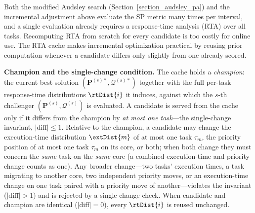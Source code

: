     Both the modified Audsley search (Section~\ref{section_audsley_pa}) and the incremental adjustment above evaluate the SP metric many times per interval, and a single evaluation already requires a response-time analysis (RTA) over all tasks.
    Recomputing RTA from scratch for every candidate is too costly for online use.
    The RTA cache makes incremental optimization practical by reusing prior computation whenever a candidate differs only slightly from one already scored.

    \textbf{Champion and the single-change condition.}
    The cache holds a \emph{champion}: the current best solution $(\boldsymbol{P}^{(s)*},\boldsymbol{\mathcal{Q}}^{(s)*})$ together with the full per-task response-time distributions $\rtDist{i}$ it induces, against which the $s$-th challenger $(\boldsymbol{P}^{(s)},\boldsymbol{\mathcal{Q}}^{(s)})$ is evaluated.
    A candidate is served from the cache only if it differs from the champion by \emph{at most one task}---the single-change invariant, $|\mathrm{diff}| \leq 1$.
    Relative to the champion, a candidate may change the execution-time distribution $\extDist{m}$ of at most one task $\tau_m$, the priority position of at most one task $\tau_m$ on its core, or both; when both change they must concern the \emph{same} task on the \emph{same} core (a combined execution-time and priority change counts as one).
    Any broader change---two tasks' execution times, a task migrating to another core, two independent priority moves, or an execution-time change on one task paired with a priority move of another---violates the invariant ($|\mathrm{diff}| > 1$) and is rejected by a single-change check.
    When candidate and champion are identical ($|\mathrm{diff}| = 0$), every $\rtDist{i}$ is reused unchanged.

